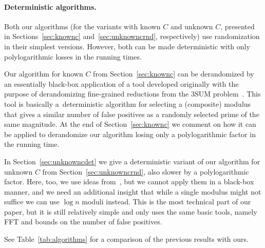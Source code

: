 \documentclass{theoretics}
\begin{document}
\paragraph{Deterministic algorithms.}
Both our algorithms (for the variants with known $C$ and unknown $C$, presented in Sections~\ref{sec:knownc} and~\ref{sec:unknowncrnd}, respectively) use randomization in their simplest versions. However, both can be made deterministic with only polylogarithmic losses in the running times.

Our algorithm for known $C$ from Section~\ref{sec:knownc} can be derandomized by an essentially black-box application of a tool developed originally with the purpose of derandomizing fine-grained reductions from the 3SUM problem~\cite{FischerK024}. This tool is basically a~deterministic algorithm for selecting a (composite) modulus that gives a similar number of false positives as a randomly selected prime of the same magnitude. At the end of Section~\ref{sec:knownc} we comment on how it can be applied to derandomize our algorithm losing only a polylogarithmic factor in the running time.


In Section~\ref{sec:unknowncdet} we give a deterministic variant of our algorithm for unknown $C$ from Section~\ref{sec:unknowncrnd}, also slower by a polylogarithmic factor. Here, too, we use ideas from~\cite{FischerK024}, but we cannot apply them in a black-box manner, and we need an additional insight that while a single modulus might not suffice we can use $\log n$ moduli instead. This is the most technical part of our paper, but it is still relatively simple and only uses the same basic tools, namely FFT and bounds on the number of false positives.

See Table~\ref{tab:algorithms} for a comparison of the previous results with ours.
\end{document}
